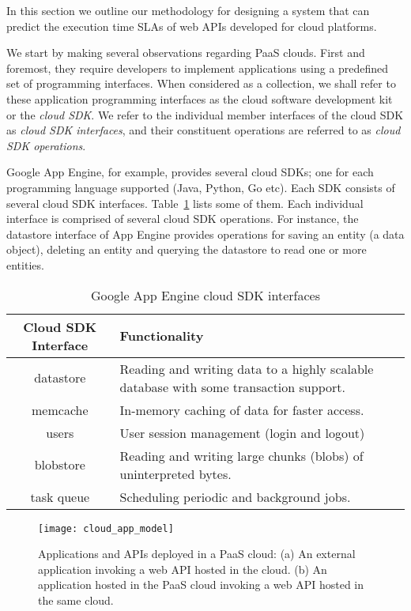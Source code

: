In this section we outline our methodology for designing a system that can predict the execution
time SLAs of web APIs developed for cloud platforms.

We start by making several observations regarding PaaS clouds. First and foremost, 
they require developers
to implement applications using a predefined set of programming interfaces. When considered as a
collection, we shall refer to these application programming interfaces as the cloud software development 
kit or the \textit{cloud SDK}. We refer to the individual member interfaces of the cloud SDK
as \textit{cloud SDK interfaces}, and their constituent operations are referred to as \textit{cloud SDK operations}.

Google App Engine, for example, provides several cloud SDKs; one for each
programming language supported (Java, Python, Go etc). Each SDK consists of
several cloud SDK interfaces. Table~\ref{tab:gae_cloud_sdk} lists some of them.
Each individual interface is comprised of several cloud SDK operations. For instance, the 
datastore interface of App Engine provides operations for saving an entity (a data object),
deleting an entity and querying the datastore to read one or more entities.

\begin{table}[htdp]
\caption{Google App Engine cloud SDK interfaces}
\begin{center}
\begin{tabular}{|c|p{5cm}|}
\hline
Cloud SDK Interface & Functionality \\ \hline
datastore & Reading and writing data to a highly scalable database with some transaction support. \\ \hline
memcache & In-memory caching of data for faster access.\\ \hline
users & User session management (login and logout)\\ \hline
blobstore & Reading and writing large chunks (blobs) of uninterpreted bytes.\\ \hline
task queue & Scheduling periodic and background jobs.\\ \hline
\end{tabular}
\end{center}
\label{tab:gae_cloud_sdk}
\end{table}

\begin{figure}
\centering
\texttt{[image: cloud\_app\_model]}
\caption{Applications and APIs deployed in a PaaS cloud: (a) An external application invoking a web API hosted in the cloud. 
(b) An application hosted in the PaaS cloud invoking a web API hosted in the same cloud.}
\label{fig:cloud_app_model}
\end{figure}

